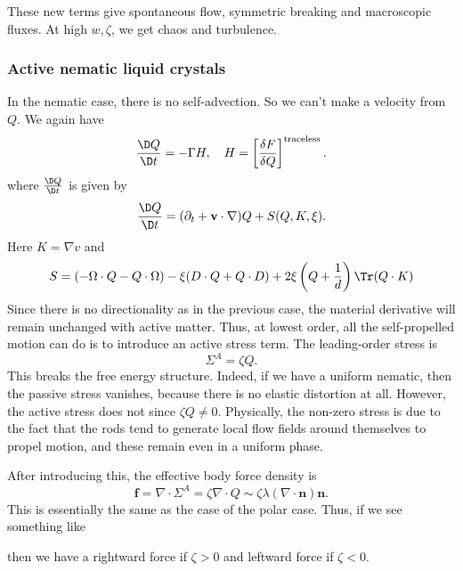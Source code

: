 \documentclass[a4paper]{article}
\begin{document}
These new terms give spontaneous flow, symmetric breaking and macroscopic fluxes. At high $w, \zeta$, we get chaos and turbulence.
\subsubsection*{Active nematic liquid crystals}
In the nematic case, there is no self-advection. So we can't make a velocity from $Q$. We again have
\[
  \frac{\D Q}{\D t} = - \Gamma H,\quad
  H = \left[\frac{\delta F}{\delta Q}\right]^{\text{traceless}}.
\]
where $\frac{\D Q}{\D t}$ is given by
\[
  \frac{\D Q}{\D t} = (\partial_t + \mathbf{v} \cdot \nabla) Q + S(Q, K, \xi).
\]
Here $K = \nabla v$ and
\[
  S = (-\Omega \cdot Q - Q \cdot \Omega) - \xi (D \cdot Q + Q \cdot D) + 2 \xi \left(Q + \frac{1}{d}\right) \Tr(Q \cdot K)
\]
Since there is no directionality as in the previous case, the material derivative will remain unchanged with active matter. Thus, at lowest order, all the self-propelled motion can do is to introduce an active stress term. The leading-order stress is
\[
  \Sigma^A = \zeta Q.
\]
This breaks the free energy structure. Indeed, if we have a uniform nematic, then the passive stress vanishes, because there is no elastic distortion at all. However, the active stress does not since $\zeta Q \not= 0$. Physically, the non-zero stress is due to the fact that the rods tend to generate local flow fields around themselves to propel motion, and these remain even in a uniform phase.

After introducing this, the effective body force density is
\[
  \mathbf{f} = \nabla \cdot \Sigma^A = \zeta \nabla \cdot Q \sim \zeta \lambda (\nabla \cdot \mathbf{n}) \mathbf{n}.
\]
This is essentially the same as the case of the polar case. Thus, if we see something like
\begin{center}
\end{center}
then we have a rightward force if $\zeta > 0$ and leftward force if $\zeta < 0$. 
\end{document}
